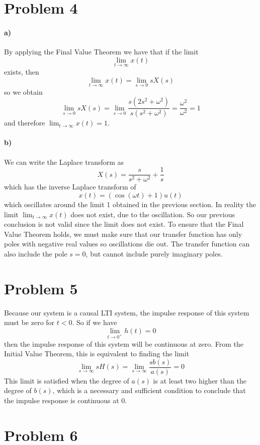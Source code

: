 \documentclass[12pt]{article}
\begin{document}
\section*{Problem 4}

\paragraph{a)}

By applying the Final Value Theorem we have that if the limit
\[\lim_{t\to\infty} x(t)\] exists, then
\[\lim_{t\to\infty} x(t) = \lim_{s\to 0} sX(s)\]
so we obtain
\[\lim_{s\to 0} sX(s) = \lim_{s\to 0} \frac{s(2s^2+\omega^2)}{s(s^2+\omega^2)} = \frac{\omega^2}{\omega^2} =1\]
and therefore \(\lim_{t\to\infty} x(t) = 1\).

\paragraph{b)}

We can write the Laplace transform as
\[X(s) = \frac{s}{s^2+\omega^2} + \frac{1}{s}\]
which has the inverse Laplace transform of
\[x(t) = (\cos(\omega t)+1)u(t)\]
which oscillates around the limit 1 obtained in the previous section. In reality the limit
\(\lim_{t\to\infty} x(t)\) does not exist, due to the oscillation. So our previous conclusion is not
valid since the limit does not exist. To ensure that the Final Value Theorem holds, we must make sure that
our transfer function has only poles with negative real values so oscillations die out. The transfer
function can also include the pole \(s=0\), but cannot include purely imaginary poles.

\section*{Problem 5}

Because our system is a causal LTI system, the impulse response of this system must be zero for \(t<0\).
So if we have
\[\lim_{t\to 0^+} h(t) = 0\]
then the impulse response of this system will be continuous at zero. From the Initial Value Theorem, this
is equivalent to finding the limit
\[\lim_{s\to\infty} sH(s) = \lim_{s\to\infty}\frac{sb(s)}{a(s)} = 0\]
This limit is satisfied when the degree of \(a(s)\) is at least two higher than the degree of \(b(s)\),
which is a necessary and sufficient condition to conclude that the impulse response is continuous at 0.

\section*{Problem 6}
\end{document}

